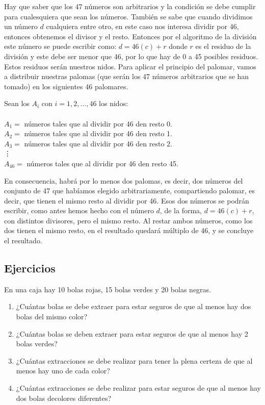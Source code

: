 \begin{solucion}
    Hay que saber que los 47 números son arbitrarios y la condición se debe cumplir para cualesquiera que sean los números. También se sabe que cuando dividimos un número $d$ cualquiera entre otro, en este caso nos interesa dividir por 46, entonces obtenemos el divisor y el resto.  Entonces por el algoritmo de la división este número se puede escribir como: $d=46(c)+r$ donde $r$ es el residuo de la división y este debe ser menor que 46, por lo que hay de 0 a 45 posibles residuos.  Estos residuos serán nuestros nidos. Para aplicar el principio del palomar, vamos a distribuir nuestras palomas (que serán los 47 números arbitrarios que se han tomado) en los siguientes 46 palomares.

    Sean los $A_i$ con $i=1,2,...,46$ los nidos: \\ \\
    $A_1 =$ números tales que al dividir por 46 den resto 0. \\
    $A_2 =$ números tales que al dividir por 46 den resto 1. \\
    $A_3 =$ números tales que al dividir por 46 den resto 2. \\
    \phantom{.} \vdots \\
    $A_{46} =$ números tales que al dividir por 46 den resto 45.

    En consecuencia, habrá por lo menos dos palomas, es decir, dos n\'umeros del conjunto de 47 que habíamos elegido arbitrariamente, compartiendo palomar, es decir, que tienen el mismo resto al dividir por 46. Esos dos números se podrán escribir, como antes hemos hecho con el número $d$, de la forma, $d=46(c)+r$, con distintos divisores, pero el mismo resto. Al restar ambos números, como los dos tienen el mismo resto, en el resultado quedará múltiplo de 46, y se concluye el resultado.
\end{solucion}

\subsection{Ejercicios}

\begin{problema}
    En una caja hay 10 bolas rojas, 15 bolas verdes y 20 bolas negras.

    \renewcommand{\labelenumi}{\alph{enumi})}
    \begin{enumerate}
        \item ¿Cuántas bolas se debe extraer para estar seguros de que al menos hay dos bolas del mismo color?
        \item ¿Cuántas bolas se deben extraer para estar seguros de que al menos hay 2 bolas verdes?
        \item ¿Cuántas extracciones se debe realizar para tener la plena certeza de que al menos hay uno de cada color?
        \item ¿Cuántas extracciones se debe realizar para estar seguros de que al menos hay dos bolas decolores diferentes?
    \end{enumerate}
\end{problema}

